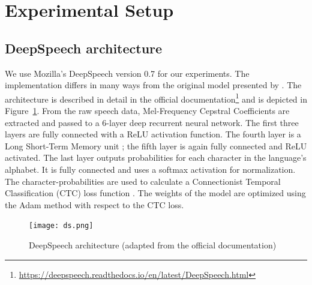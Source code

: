 \documentclass[11pt]{article}
\newcommand{\tz}[1]{\textcolor{red}{\textbf{TZ:} #1}}
\newcommand{\tz}[1]{}
\begin{document}
\section{Experimental Setup}
\subsection{DeepSpeech architecture}
We use Mozilla's DeepSpeech version 0.7 for our experiments. The implementation differs in many ways from the original model presented by \textcite{hannun2014deep}. The architecture is described in detail in the official documentation\footnote{\url{https://deepspeech.readthedocs.io/en/latest/DeepSpeech.html}} and is depicted in Figure~\ref{fig:ds}. From the raw speech data, Mel-Frequency Cepstral Coefficients \parencite{imai1983cepstral} are extracted and passed to a 6-layer deep recurrent neural network. The first three layers are fully connected with a ReLU activation function. The fourth layer is a Long Short-Term Memory unit \parencite{hochreiter1997long}; the fifth layer is again fully connected and ReLU activated. The last layer outputs probabilities for each character in the language's alphabet. It is fully connected and uses a softmax activation for normalization. The character-probabilities are used to calculate a Connectionist Temporal Classification (CTC) loss function \parencite{graves2006connectionist}. The weights of the model are optimized using the Adam method \parencite{kingma2014adam} with respect to the CTC loss.

\begin{figure}[ht]
    \centering
    \texttt{[image: ds.png]}
    \caption{DeepSpeech architecture (adapted from the official documentation\protect\footnotemark[\value{footnote}])}
    \label{fig:ds}
\end{figure}
\end{document}
